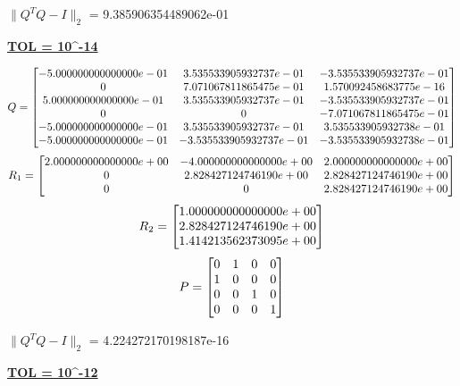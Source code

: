 \documentclass[final,12pt,reqno]{amsart}
\begin{document}
$\|Q^TQ-I\|_2$ = 9.385906354489062e-01

\textbf{\underline{TOL = 10^{-14}}}

\[
Q =
\left[\begin{array}{@{}*{3}{c}@{}}
    -5.000000000000000e-01&     3.535533905932737e-01&    -3.535533905932737e-01\\
                         0&     7.071067811865475e-01&     1.570092458683775e-16\\
     5.000000000000000e-01&     3.535533905932737e-01&    -3.535533905932737e-01\\
                         0&                         0&    -7.071067811865475e-01\\
    -5.000000000000000e-01&     3.535533905932737e-01&     3.535533905932738e-01\\
    -5.000000000000000e-01&    -3.535533905932737e-01&    -3.535533905932738e-01
  \end{array} \right]
\]
\[
R_1 =
\left[\begin{array}{@{}*{3}{c}@{}}
     2.000000000000000e+00&    -4.000000000000000e+00&     2.000000000000000e+00\\
                         0&     2.828427124746190e+00&     2.828427124746190e+00\\
                         0&                         0&     2.828427124746190e+00
  \end{array} \right]
\]
\[
R_2 =
\left[\begin{array}{@{}*{1}{c}@{}}
     1.000000000000000e+00\\
     2.828427124746190e+00\\
     1.414213562373095e+00
  \end{array} \right]
\]
\[
P = 
\left[\begin{array}{@{}*{4}{c}@{}}
     0&     1&     0&     0\\
     1&     0&     0&     0\\
     0&     0&     1&     0\\
     0&     0&     0&     1
  \end{array} \right]
\]

$\|Q^TQ-I\|_2$ = 4.224272170198187e-16

\textbf{\underline{TOL = 10^{-12}}}
\end{document}
